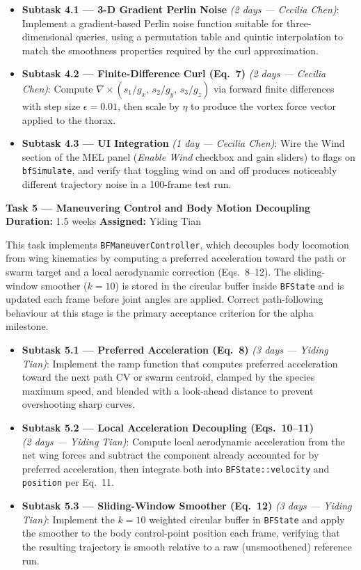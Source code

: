 \documentclass[12pt]{article}
\begin{document}
\begin{itemize}
  \item \textbf{Subtask 4.1 --- 3-D Gradient Perlin Noise} \textit{(2 days --- Cecilia Chen)}: Implement a
    gradient-based Perlin noise function suitable for three-dimensional queries,
    using a permutation table and quintic interpolation to match the smoothness
    properties required by the curl approximation.
  \item \textbf{Subtask 4.2 --- Finite-Difference Curl (Eq.~7)} \textit{(2 days --- Cecilia Chen)}: Compute
    $\nabla \times (s_1/g_x,\, s_2/g_y,\, s_3/g_z)$ via forward finite differences
    with step size $\epsilon = 0.01$, then scale by $\eta$ to produce the vortex
    force vector applied to the thorax.
  \item \textbf{Subtask 4.3 --- UI Integration} \textit{(1 day --- Cecilia Chen)}: Wire the Wind section of the MEL
    panel (\textit{Enable Wind} checkbox and gain sliders) to flags on
    \texttt{bfSimulate}, and verify that toggling wind on and off produces
    noticeably different trajectory noise in a 100-frame test run.
\end{itemize}

\bigskip
\noindent\textbf{Task 5 --- Maneuvering Control and Body Motion Decoupling}\\
\textbf{Duration:} 1.5 weeks \quad \textbf{Assigned:} Yiding Tian

This task implements \texttt{BFManeuverController}, which decouples body locomotion
from wing kinematics by computing a preferred acceleration toward the path or swarm
target and a local aerodynamic correction (Eqs.~8--12). The sliding-window smoother
($k=10$) is stored in the circular buffer inside \texttt{BFState} and is updated
each frame before joint angles are applied. Correct path-following behaviour at this
stage is the primary acceptance criterion for the alpha milestone.

\begin{itemize}
  \item \textbf{Subtask 5.1 --- Preferred Acceleration (Eq.~8)} \textit{(3 days --- Yiding Tian)}: Implement the
    ramp function that computes preferred acceleration toward the next path CV or
    swarm centroid, clamped by the species maximum speed, and blended with a look-ahead
    distance to prevent overshooting sharp curves.
  \item \textbf{Subtask 5.2 --- Local Acceleration Decoupling (Eqs.~10--11)}\\
    \textit{(2 days --- Yiding Tian)}:
    Compute local aerodynamic acceleration from the net wing forces and subtract
    the component already accounted for by preferred acceleration, then integrate
    both into \texttt{BFState::velocity} and \texttt{position} per Eq.~11.
  \item \textbf{Subtask 5.3 --- Sliding-Window Smoother (Eq.~12)} \textit{(3 days --- Yiding Tian)}: Implement the
    $k=10$ weighted circular buffer in \texttt{BFState} and apply the smoother to
    the body control-point position each frame, verifying that the resulting
    trajectory is smooth relative to a raw (unsmoothened) reference run.
\end{itemize}
\end{document}
